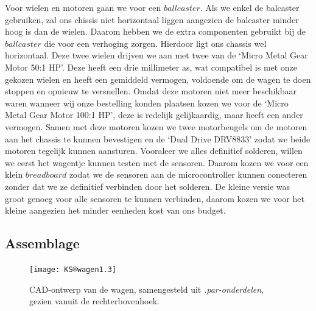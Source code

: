 \documentclass[a4paper,twoside,kulak]{kulakreport}
\begin{document}
	\bigskip
	Voor wielen en motoren gaan we voor een $ball caster$. Als we enkel de balcaster gebruiken, zal ons chissis niet horizontaal liggen aangezien de balcaster minder hoog is dan de wielen. Daarom hebben we de extra componenten gebruikt bij de $ball caster$ die voor een verhoging zorgen. Hierdoor ligt ons chassis wel horizontaal. 
	Deze twee wielen drijven we aan met twee van de `Micro Metal Gear Motor 50:1 HP'.
	Deze heeft een drie millimeter as, wat compatibel is met onze gekozen wielen en heeft een gemiddeld vermogen, voldoende om de wagen te doen stoppen en opnieuw te versnellen.
	Omdat deze motoren niet meer beschikbaar waren wanneer wij onze bestelling konden plaatsen kozen we voor de `Micro Metal Gear Motor 100:1 HP', deze is redelijk gelijkaardig, maar heeft een ander vermogen. 
	Samen met deze motoren kozen we twee motorbeugels om de motoren aan het chassis te kunnen bevestigen en de `Dual Drive DRV8833' zodat we beide motoren tegelijk kunnen aansturen.
	Vooraleer we alles definitief solderen, willen we eerst het wagentje kunnen testen met de sensoren. Daarom kozen we voor een klein $breadboard$ zodat we de sensoren aan de microcontroller kunnen conecteren zonder dat we ze definitief verbinden door het solderen. De kleine versie was groot genoeg voor alle sensoren te kunnen verbinden, daarom kozen we voor het kleine aangezien het minder eenheden kost van ons budget. 
	\newpage
	\subsection{Assemblage}
	\begin{figure}[h]
		\centering
		\texttt{[image: KS®wagen1.3]}
		\caption{CAD-ontwerp van de wagen, samengesteld uit \textit{.par-onderdelen}, gezien vanuit de rechterbovenhoek.}
		\label{fig: wagen}
	\end{figure}
	
\end{document}
